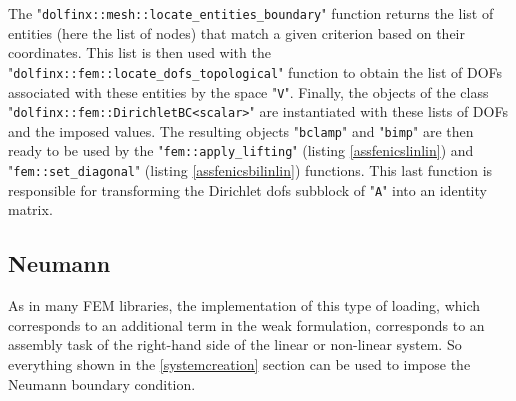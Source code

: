 \documentclass[12pt]{article}
\newcommand{\mycode}[1]{\textsf{"}\lstinline`#1`\textsf{"}}
\begin{document}
The \mycode{dolfinx::mesh::locate_entities_boundary} function returns the list of entities (here the list of nodes) that match a given criterion based on their coordinates. 
This list is then used with the \mycode{dolfinx::fem::locate_dofs_topological} function to obtain the list of DOFs associated with these entities by the space \mycode{V}.
Finally, the objects of the class \mycode{dolfinx::fem::DirichletBC<scalar>} are instantiated with these lists of DOFs and the imposed values. 
The resulting objects \mycode{bclamp} and \mycode{bimp} are then ready to be used by the \mycode{fem::apply_lifting} (listing \ref{assfenicslinlin}) and \mycode{fem::set_diagonal} (listing \ref{assfenicsbilinlin}) functions. 
 This last function is responsible for transforming the Dirichlet dofs subblock of \mycode{A} into an identity matrix.

\subsection{Neumann\label{bc_neuman}}
As in many FEM libraries, the implementation of this type of loading, which corresponds to an additional term in the weak formulation, corresponds to an assembly task of the right-hand side of the linear or non-linear system.
So everything shown in the \ref{systemcreation} section can be used to impose the Neumann boundary condition.
\end{document}
